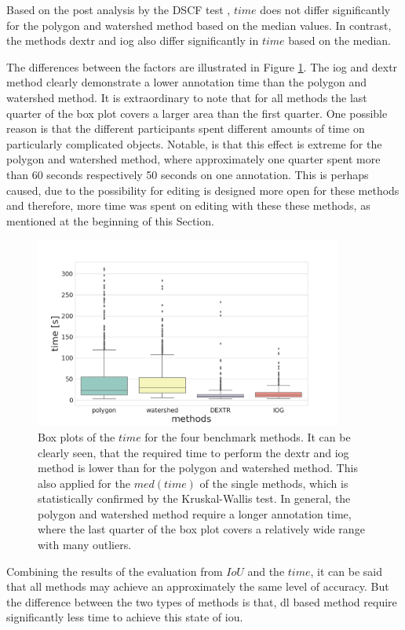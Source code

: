 Based on the post analysis by the DSCF test \cite{CF91-dscf}, $ time $ does not differ significantly for the polygon and watershed method based on the median values.
In contrast, the methods \gls{dextr} and \gls{iog} also differ significantly in $ time $ based on the median.

The differences between the factors are illustrated in Figure \ref{fig:ch5:sec1:time_box_plot}.
The \gls{iog} and \gls{dextr} method clearly demonstrate a lower annotation time than the polygon and watershed method.
It is extraordinary to note that for all methods the last quarter of the box plot covers a larger area than the first quarter.
One possible reason is that the different participants spent different amounts of time on particularly complicated objects.
Notable, is that this effect is extreme for the polygon and watershed method, where approximately one quarter spent more than 60 seconds respectively 50 seconds on one annotation. 
This is perhaps caused, due to the possibility for editing is designed more open for these methods and therefore, more time was spent on editing with these these methods, as mentioned at the beginning of this Section.

\begin{figure}
	\centering
	\includegraphics[width=0.9\textwidth]{figures/chap51_time_boxplot.png}
	\caption[Box plots of the methods on $ IoU  $]{
		Box plots of the $ time $ for the four benchmark methods.
		It can be clearly seen, that the required time to perform the \gls{dextr} and \gls{iog} method is lower than for the polygon and watershed method.
		This also applied for the $ med \left( time \right) $ of the single methods, which is statistically confirmed by the Kruskal-Wallis test.
		In general, the polygon and watershed method require a longer annotation time, where the last quarter of the box plot covers a relatively wide range with many outliers. 
	} \label{fig:ch5:sec1:time_box_plot}
\end{figure}


Combining the results of the evaluation from $ IoU $ and the $ time $, it can be said that all methods may achieve an approximately the same level of accuracy.
But the difference between the two types of methods is that, \gls{dl} based method require significantly less time to achieve this state of \gls{iou}.




